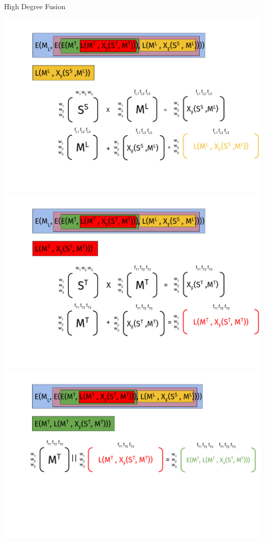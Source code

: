 \documentclass[10pt,=table]{beamer}
\begin{document}
\begin{frame}{High Degree Fusion}
\begin{overprint}
	\includegraphics[width=1\linewidth]{image2/Chapitre2/hybrid_fusion1.pdf}%
	\onslide<4>\includegraphics[width=1\linewidth]{image2/Chapitre2/hybrid_fusion2.pdf}%
	\onslide<5>\includegraphics[width=1\linewidth]{image2/Chapitre2/hybrid_fusion3.pdf}%

\end{overprint}
\end{frame}
\end{document}
